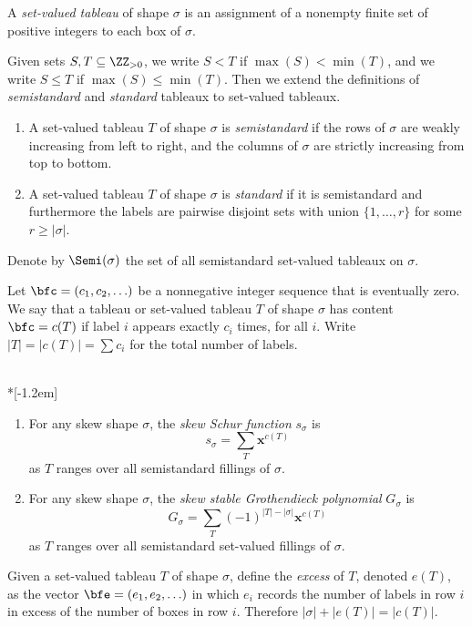 \begin{defi} \label{def:svt}
A \emph{set-valued tableau} of shape $\sigma$ is an assignment of a nonempty finite set of positive integers to each box of $\sigma$. 

Given sets $S,T\subseteq \ZZ_{>0}$, we write $S<T$ if $\max(S)<\min(T)$, and we write $S\le T$ if $\max(S)\le\min(T)$. Then we extend the definitions of \emph{semistandard} and \emph{standard} tableaux to set-valued tableaux.
\begin{enumerate}
\item \label{it:sstd}A set-valued tableau $T$ of shape $\sigma$ is \emph{semistandard} if the rows of $\sigma$ are weakly increasing from left to right, and the columns of $\sigma$ are strictly increasing from top to bottom.
\item \label{it:std} A set-valued tableau $T$ of shape $\sigma$ is \emph{standard} if it is semistandard and furthermore the labels are pairwise disjoint sets with union $\{1,\ldots,r\}$ for some $r \ge |\sigma|$.
\end{enumerate}
Denote by $\Semi(\sigma)$ the set of all semistandard set-valued tableaux on $\sigma$.
\end{defi}


Let $\bfc=(c_1,c_2,\ldots)$ be a nonnegative integer sequence that is eventually zero. We say that a tableau or set-valued tableau $T$ of shape $\sigma$ has content $\bfc = c(T)$ if label $i$ appears exactly $c_i$ times, for all $i$. 
Write $|T| = |c(T)| = \sum c_i$ for the total number of labels.

\begin{defi} \label{def:schur-groth}\ \\*[-1.2em]
\begin{enumerate}
\item\label{defi2.4_1}
For any skew shape $\sigma$, the \emph{skew Schur function} $s_\sigma$ is
\[
s_\sigma =\sum_T {\mathbf{x}}^{c(T)}
\]
as $T$ ranges over all semistandard fillings of $\sigma.$
\item\label{defi2.4_2}
For any skew shape $\sigma$, the \emph{skew stable Grothendieck polynomial} $G_\sigma$ is
\[
G_\sigma =\sum_T (-1)^{|T|-|\sigma|}{\mathbf{x}}^{c(T)}
\]
as $T$ ranges over all semistandard set-valued fillings of $\sigma.$
\end{enumerate}
\end{defi}

Given a set-valued tableau $T$ of shape $\sigma$, define the \emph{excess} of $T$, denoted $e(T)$, as the vector $\bfe = (e_1,e_2,\ldots)$ in which $e_i$ records the number of labels in row $i$ in excess of the number of boxes in row $i$. Therefore $|\sigma|+|e(T)|=|c(T)|$. 

